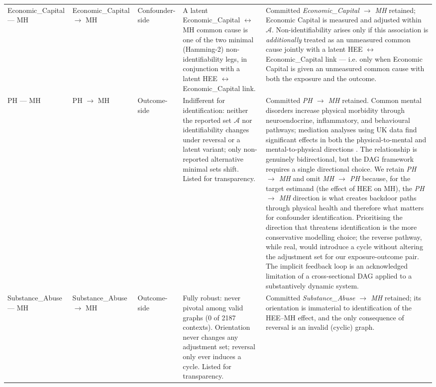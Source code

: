 \begin{longtable}{@{}p{1.9cm}p{1.9cm}p{1.4cm}p{2.7cm}p{4.9cm}@{}}
\addlinespace
Economic\_Capital --- MH & Economic\_Capital $\to$ MH & Confounder-side & A latent Economic\_Capital $\leftrightarrow$ MH common cause is one of the two minimal (Hamming-2) non-identifiability legs, in conjunction with a latent HEE $\leftrightarrow$ Economic\_Capital link. & Committed \textit{Economic\_Capital $\to$ MH} retained; Economic Capital is measured and adjusted within $\mathcal{A}$. Non-identifiability arises only if this association is \emph{additionally} treated as an unmeasured common cause jointly with a latent HEE $\leftrightarrow$ Economic\_Capital link --- i.e. only when Economic Capital is given an unmeasured common cause with both the exposure and the outcome. \\
\addlinespace
PH --- MH & PH $\to$ MH & Outcome-side & Indifferent for identification: neither the reported set $\mathcal{A}$ nor identifiability changes under reversal or a latent variant; only non-reported alternative minimal sets shift. Listed for transparency. & Committed \textit{PH $\to$ MH} retained. Common mental disorders increase physical morbidity through neuroendocrine, inflammatory, and behavioural pathways; mediation analyses using UK data find significant effects in both the physical-to-mental and mental-to-physical directions \citep{ohrnberger_relationship_2017, berk_comorbidity_2023}. The relationship is genuinely bidirectional, but the DAG framework requires a single directional choice. We retain \textit{PH $\to$ MH} and omit \textit{MH $\to$ PH} because, for the target estimand (the effect of HEE on MH), the \textit{PH $\to$ MH} direction is what creates backdoor paths through physical health and therefore what matters for confounder identification. Prioritising the direction that threatens identification is the more conservative modelling choice; the reverse pathway, while real, would introduce a cycle without altering the adjustment set for our exposure-outcome pair. The implicit feedback loop is an acknowledged limitation of a cross-sectional DAG applied to a substantively dynamic system. \\
\addlinespace
Substance\_Abuse --- MH & Substance\_Abuse $\to$ MH & Outcome-side & Fully robust: never pivotal among valid graphs (0 of 2187 contexts). Orientation never changes any adjustment set; reversal only ever induces a cycle. Listed for transparency. & Committed \textit{Substance\_Abuse $\to$ MH} retained; its orientation is immaterial to identification of the HEE--MH effect, and the only consequence of reversal is an invalid (cyclic) graph. \\

\end{longtable}
